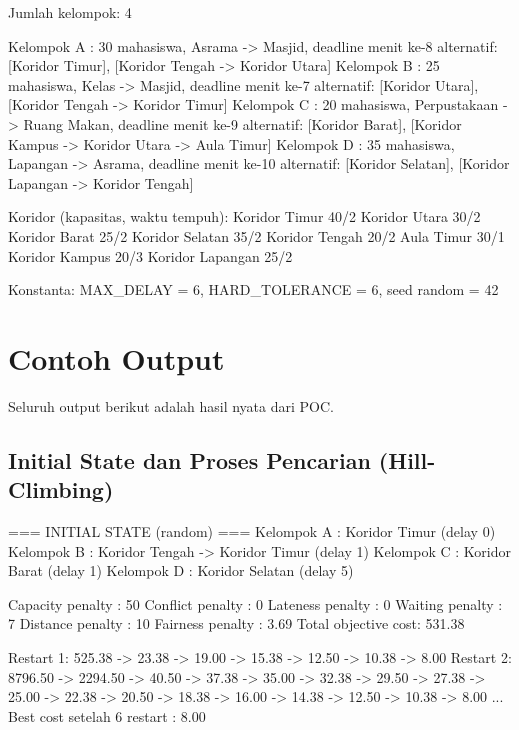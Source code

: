 \documentclass[11pt,a4paper]{article}
\begin{document}
\begin{outcode}
Jumlah kelompok: 4

Kelompok A  : 30 mahasiswa, Asrama -> Masjid,       deadline menit ke-8
              alternatif: [Koridor Timur], [Koridor Tengah -> Koridor Utara]
Kelompok B  : 25 mahasiswa, Kelas -> Masjid,        deadline menit ke-7
              alternatif: [Koridor Utara], [Koridor Tengah -> Koridor Timur]
Kelompok C  : 20 mahasiswa, Perpustakaan -> Ruang Makan, deadline menit ke-9
              alternatif: [Koridor Barat], [Koridor Kampus -> Koridor Utara -> Aula Timur]
Kelompok D  : 35 mahasiswa, Lapangan -> Asrama,     deadline menit ke-10
              alternatif: [Koridor Selatan], [Koridor Lapangan -> Koridor Tengah]

Koridor (kapasitas, waktu tempuh):
Koridor Timur 40/2   Koridor Utara 30/2   Koridor Barat 25/2   Koridor Selatan 35/2
Koridor Tengah 20/2  Aula Timur 30/1      Koridor Kampus 20/3  Koridor Lapangan 25/2

Konstanta: MAX_DELAY = 6, HARD_TOLERANCE = 6, seed random = 42
\end{outcode}

\section{Contoh Output}

Seluruh output berikut adalah hasil nyata dari POC.

\subsection{Initial State dan Proses Pencarian (Hill-Climbing)}

\begin{outcode}
=== INITIAL STATE (random) ===
Kelompok A  : Koridor Timur (delay 0)
Kelompok B  : Koridor Tengah -> Koridor Timur (delay 1)
Kelompok C  : Koridor Barat (delay 1)
Kelompok D  : Koridor Selatan (delay 5)

Capacity penalty : 50
Conflict penalty : 0
Lateness penalty : 0
Waiting penalty  : 7
Distance penalty : 10
Fairness penalty : 3.69
Total objective cost: 531.38

Restart 1: 525.38 -> 23.38 -> 19.00 -> 15.38 -> 12.50 -> 10.38 -> 8.00
Restart 2: 8796.50 -> 2294.50 -> 40.50 -> 37.38 -> 35.00 -> 32.38 -> 29.50
           -> 27.38 -> 25.00 -> 22.38 -> 20.50 -> 18.38 -> 16.00 -> 14.38
           -> 12.50 -> 10.38 -> 8.00
...
Best cost setelah 6 restart : 8.00
\end{outcode}
\end{document}
